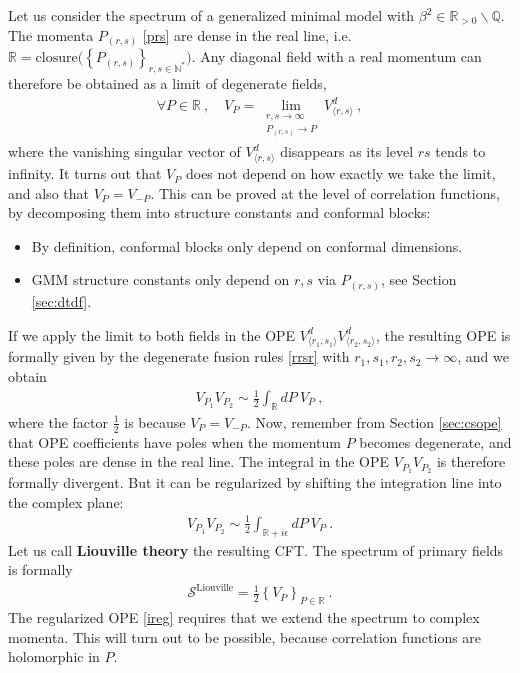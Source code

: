 \documentclass[12pt, a4paper]{article}
\newcommand{\myindex}[1]{\textbf{\boldmath #1}}
\begin{document}
Let us consider the spectrum of a generalized minimal model with $\beta^2\in\mathbb{R}_{>0}\backslash\mathbb{Q}$. The momenta $P_{(r,s)}$ \eqref{prs} are dense in the real line, i.e. $\mathbb{R}=\text{closure}\big(\left\{ P_{(r,s)}\right\}_{r,s\in\mathbb{N}^*}\big)$. Any diagonal field with a real momentum can therefore be obtained as a limit of degenerate fields,
\begin{align}
 \forall P\in\mathbb{R}\ , \quad V_P = \lim_{\substack{r,s\to\infty \\ P_{(r,s)}\to P}} V^d_{\langle r,s\rangle}\ ,
 \label{vplim}
\end{align}
where the vanishing singular vector of $V^d_{\langle r,s\rangle}$ disappears as its level $rs$ tends to infinity.
It turns out that $V_P$ does not depend on how exactly we take the limit, and also that $V_P=V_{-P}$. This can be proved at the level of correlation functions, by decomposing them into structure constants and conformal blocks:
\begin{itemize}
 \item By definition, conformal blocks only depend on conformal dimensions.
 \item GMM structure constants only depend on $r,s$ via $P_{(r,s)}$, see Section \ref{sec:dtdf}.
\end{itemize}
If we apply the limit to both fields in the OPE $V^d_{\langle r_1,s_1\rangle}V^d_{\langle r_2,s_2\rangle}$, the resulting OPE is formally given by the degenerate fusion rules \eqref{rrsr} with $r_1,s_1,r_2,s_2\to\infty$, and we obtain
\begin{align}
 \boxed{V_{P_1}V_{P_2} \sim \frac12 \int_\mathbb{R} dP\ V_P} \ ,
 \label{idpv}
\end{align}
where the factor $\frac12$ is because $V_P=V_{-P}$. Now, remember from Section \ref{sec:csope} that OPE coefficients have poles when the momentum $P$ becomes degenerate, and these poles are dense in the real line. The integral in the OPE $V_{P_1}V_{P_2}$ is therefore formally divergent. But it can be regularized by shifting the integration line into the complex plane:
\begin{align}
 V_{P_1}V_{P_2} \sim \frac12 \int_{\mathbb{R}+i\epsilon} dP\ V_P\ .
 \label{ireg}
\end{align}
Let us call \myindex{Liouville theory} the resulting CFT. The spectrum of primary fields is formally
\begin{align}
 \boxed{\mathcal{S}^\text{Liouville} = \frac12 \left\{ V_P\right\}_{P\in \mathbb{R}}}\ .
 \label{sliou}
\end{align}
The regularized OPE \eqref{ireg} requires that we extend the spectrum to complex momenta. This will turn out to be possible, because correlation functions are holomorphic in $P$.
\end{document}
